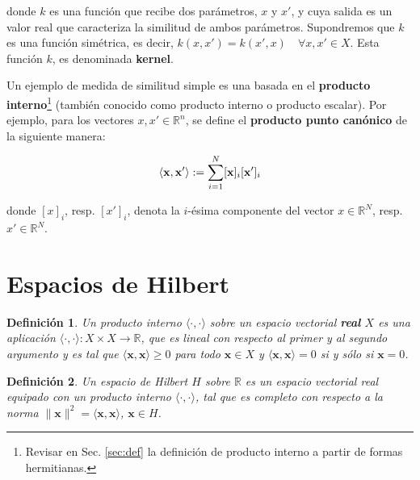 \documentclass[12pt]{article}
\newtheorem*{mydef}{Definición}
\begin{document}
\noindent donde $k$ es una función que recibe dos parámetros, $x$ y $x'$, y cuya salida es un valor real que caracteriza la similitud de ambos parámetros. Supondremos que $k$ es una función simétrica, es decir, $k(x,x')= k(x',x) \quad \forall x, x' \in X$. Esta función $k$, es denominada \textbf{kernel}.


Un ejemplo de medida de similitud simple es una basada en el \textbf{producto interno}\footnote{Revisar en Sec. \ref{sec:def} la definición de producto interno a partir de formas hermitianas.} (también conocido como producto interno o producto escalar). Por ejemplo, para los vectores $x, x' \in \mathbb{R}^n$, se define el \textbf{producto punto canónico} de la siguiente manera:

\begin{equation}
\langle {\bf x}, {\bf x' } \rangle := \sum \limits_{i=1}^{N} [{\bf x}]_i [{\bf x' }]_i 
\end{equation}

\noindent donde $[x]_i$, resp.  $[x']_i$, denota la $i$-\'esima
componente del vector $x\in\mathbb{R}^N$, resp.  $x'\in\mathbb{R}^N$.









\section{Espacios de Hilbert}

\begin{mydef}
Un producto interno $\langle\cdot,\cdot\rangle$ sobre un espacio vectorial
{\bf real} $X$ es una aplicaci\'on 
$\langle\cdot,\cdot\rangle:X\times X\to\mathbb{R}$,
que es lineal con respecto al primer y al segundo argumento
y es tal que 
$\langle\mathbf{x}, \mathbf{x}\rangle\geq0$ para todo $\mathbf{x}\in X$
y $\langle\mathbf{x}, \mathbf{x}\rangle=0$ si y s\'olo si $\mathbf{x}=0$.
\end{mydef}

\begin{mydef}
Un espacio de Hilbert $H$ sobre $\mathbb{R}$ es un espacio vectorial real
equipado con un producto interno $\langle\cdot,\cdot\rangle$, tal que
es completo con respecto a la norma
$\|\mathbf{x}\|^{2}= \langle\mathbf{x},\mathbf{x}\rangle$,
$\mathbf{x}\in H$.
\end{mydef}
\end{document}
